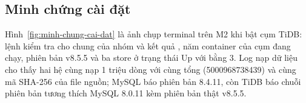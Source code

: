 \subsection{Minh chứng cài đặt}

Hình~\ref{fig:minh-chung-cai-dat} là ảnh chụp terminal trên M2 khi bật cụm TiDB: lệnh kiểm tra cho  chung của nhóm và kết quả , năm container của cụm đang chạy, phiên bản v8.5.5 và ba store ở trạng thái Up với  bằng 3. Log nạp dữ liệu cho thấy hai hệ cùng nạp 1 triệu dòng với cùng tổng  (5000968738439) và cùng mã SHA-256 của file nguồn; MySQL báo phiên bản 8.4.11, còn TiDB báo chuỗi phiên bản tương thích MySQL 8.0.11 kèm phiên bản thật v8.5.5.

